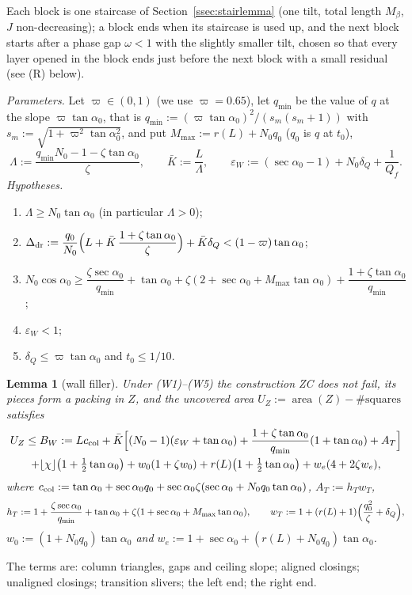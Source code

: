 \documentclass[11pt]{amsart}
\newcommand{\caz}{\cos\alpha_0}
\newcommand{\taz}{\tan\alpha_0}
\newcommand{\sez}{\sec\alpha_0}
\newcommand{\Kb}{\bar K}
\newtheorem{lemma}[theorem]{Lemma}
\theoremstyle{definition}
\theoremstyle{remark}
\numberwithin{equation}{section}
\begin{document}
Each block is one staircase of Section~\ref{ssec:stairlemma} (one tilt, total length $M_\beta$, $J$ non-decreasing); a
block ends when its staircase is used up, and the next block starts after a phase gap $\omega<1$ with the slightly
smaller tilt, chosen so that every layer opened in the block ends just before the next block with a small residual
(see (R) below).

\emph{Parameters.} Let $\varpi\in(0,1)$ (we use $\varpi=0.65$), let $q_{\min}$ be the value of $q$ at the slope
$\varpi\taz$, that is $q_{\min}:=(\varpi\taz)^2/(s_m(s_m+1))$ with $s_m:=\sqrt{1+\varpi^2\taz^2}$, and put
$M_{\max}:=r(L)+N_0q_0$ ($q_0$ is $q$ at $t_0$),
\[
\Lambda:=\frac{q_{\min}N_0-1-\zeta\taz}{\zeta},\qquad \Kb:=\frac L\Lambda,\qquad
\varepsilon_W:=(\sez-1)+N_0\delta_Q+\frac1{Q_f}.
\]
\emph{Hypotheses.}
\begin{enumerate}[label=(W\arabic*)]
\item $\Lambda\ge N_0\taz$ (in particular $\Lambda>0$);
\item $\Delta_{\rm dr}:=\dfrac{q_0}{N_0}\Bigl(L+\Kb\,\dfrac{1+\zeta\taz}{\zeta}\Bigr)+\Kb\delta_Q<(1-\varpi)\taz$;
\item $N_0\caz\ge\dfrac{\zeta\sez}{q_{\min}}+\taz+\zeta(2+\sez+M_{\max}\taz)+\dfrac{1+\zeta\taz}{q_{\min}}$;
\item $\varepsilon_W<1$;
\item $\delta_Q\le\varpi\taz$ and $t_0\le1/10$.
\end{enumerate}

\begin{lemma}[wall filler]\label{lem:W}
Under (W1)--(W5) the construction ZC does not fail, its pieces form a packing in $Z$, and the uncovered area
$U_Z:=\operatorname{area}(Z)-\#\text{squares}$ satisfies
\begin{multline*}
U_Z\le B_W:=Lc_{\rm col}+\Kb\Bigl[(N_0-1)(\varepsilon_W+\taz)+\frac{1+\zeta\taz}{q_{\min}}(1+\taz)+A_T\Bigr]\\
+\lfloor\chi\rfloor\bigl(1+\tfrac12\taz\bigr)+w_0(1+\zeta w_0)+r(L)\bigl(1+\tfrac12\taz\bigr)+w_e(4+2\zeta w_e),
\end{multline*}
where $c_{\rm col}:=\taz+\sez q_0+\sez\zeta(\sez+N_0q_0\taz)$, $A_T:=h_Tw_T$,
\[
h_T:=1+\frac{\zeta\sez}{q_{\min}}+\taz+\zeta(1+\sez+M_{\max}\taz),\qquad
w_T:=1+(r(L)+1)\Bigl(\frac{q_0^2}\zeta+\delta_Q\Bigr),
\]
$w_0:=(1+N_0q_0)\taz$ and $w_e:=1+\sez+(r(L)+N_0q_0)\taz$.
\end{lemma}

The terms are: column triangles, gaps and ceiling slope; aligned closings; unaligned closings; transition slivers; the
left end; the right end.
\end{document}
